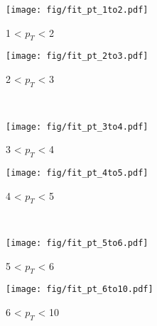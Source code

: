            \begin{figure}[htbp]
                \centering
                \begin{minipage}{0.45\textwidth}
                    \centering
                    \texttt{[image: fig/fit\_pt\_1to2.pdf]}
                    \caption{1 < $p_{T}$ < 2}
                    \label{fig:fit_1to2}
                \end{minipage}
                \hfill
                \begin{minipage}{0.45\textwidth}
                    \centering
                    \texttt{[image: fig/fit\_pt\_2to3.pdf]}
                    \caption{2 < $p_{T}$ < 3}
                    \label{fig:fit_2to3}
                \end{minipage}
                \\
                \vspace{1em}
                \begin{minipage}{0.45\textwidth}
                    \centering
                    \texttt{[image: fig/fit\_pt\_3to4.pdf]}
                    \caption{3 < $p_{T}$ < 4}
                    \label{fig:fit_3to4}
                \end{minipage}
                \hfill
                \begin{minipage}{0.45\textwidth}
                    \centering
                    \texttt{[image: fig/fit\_pt\_4to5.pdf]}
                    \caption{4 < $p_{T}$ < 5}
                    \label{fig:fit_4to5}
                \end{minipage}
                \\
                \vspace{1em}
                \begin{minipage}{0.45\textwidth}
                    \centering
                    \texttt{[image: fig/fit\_pt\_5to6.pdf]}
                    \caption{5 < $p_{T}$ < 6}
                    \label{fig:fit_5to6}
                \end{minipage}
                \hfill
                \begin{minipage}{0.45\textwidth}
                    \centering
                    \texttt{[image: fig/fit\_pt\_6to10.pdf]}
                    \caption{6 < $p_{T}$ < 10}
                    \label{fig:fit_6to10}
                \end{minipage}
                \label{fig:fit_pt_separation}
            \end{figure}

